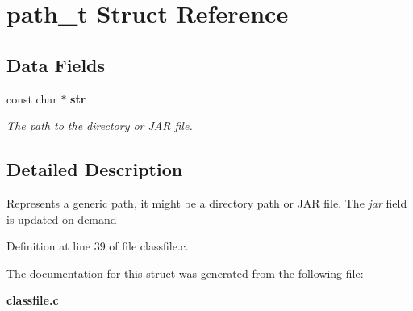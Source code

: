 \section{path\_\-t Struct Reference}
\label{structpath__t}
\subsection*{Data Fields}
\begin{DoxyCompactItemize}
\item 
const char $\ast$ {\bf str}\label{structpath__t_ae8bfa4e6978a4fd2ebc6a913a7a23c7a}

\begin{DoxyCompactList}\small\item\em The path to the directory or JAR file. \item\end{DoxyCompactList}\end{DoxyCompactItemize}


\subsection{Detailed Description}
Represents a generic path, it might be a directory path or JAR file. The {\itshape jar\/} field is updated on demand 

Definition at line 39 of file classfile.c.



The documentation for this struct was generated from the following file:\begin{DoxyCompactItemize}
\item 
{\bf classfile.c}\end{DoxyCompactItemize}
